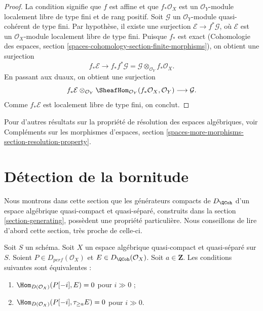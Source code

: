 \begin{proof}
La condition signifie que $f$ est affine et que $f_*\mathcal{O}_X$ est un
$\mathcal{O}_Y$-module localement libre de type fini et de rang positif.
Soit $\mathcal{G}$ un $\mathcal{O}_Y$-module quasi-coh\'erent de type fini.
Par hypoth\`ese, il existe une surjection
$\mathcal{E}\to f^*\mathcal{G}$, o\`u $\mathcal{E}$ est un
$\mathcal{O}_X$-module localement libre de type fini. Puisque $f_*$ est exact
(Cohomologie des espaces, section
\ref{spaces-cohomology-section-finite-morphisms}), on obtient une surjection
$$
f_*\mathcal{E}
\longrightarrow
f_*f^*\mathcal{G} = \mathcal{G} \otimes_{\mathcal{O}_Y} f_*\mathcal{O}_X.
$$
En passant aux duaux, on obtient une surjection
$$
f_*\mathcal{E}
\otimes_{\mathcal{O}_Y}
\SheafHom_{\mathcal{O}_Y}(f_*\mathcal{O}_X, \mathcal{O}_Y)
\longrightarrow
\mathcal{G}.
$$
Comme $f_*\mathcal{E}$ est localement libre de type fini, on conclut.
\end{proof}

\noindent
Pour d'autres r\'esultats sur la propri\'et\'e de r\'esolution des espaces
alg\'ebriques, voir Compl\'ements sur les morphismes d'espaces, section
\ref{spaces-more-morphisms-section-resolution-property}.












\section{D\'etection de la bornitude}
\label{section-detecting-boundedness}

\noindent
Nous montrons dans cette section que les g\'en\'erateurs compacts de $D_\QCoh$
d'un espace alg\'ebrique quasi-compact et quasi-s\'epar\'e, construits dans la
section \ref{section-generating}, poss\`edent une propri\'et\'e particuli\`ere.
Nous conseillons de lire d'abord cette section, tr\`es proche de celle-ci.

\begin{lemma}
\label{lemma-bounded-truncation}
Soit $S$ un sch\'ema.
Soit $X$ un espace alg\'ebrique quasi-compact et quasi-s\'epar\'e sur $S$.
Soient $P\in D_{perf}(\mathcal{O}_X)$ et
$E\in D_{\QCoh}(\mathcal{O}_X)$. Soit $a\in\mathbf{Z}$.
Les conditions suivantes sont \'equivalentes :
\begin{enumerate}
\item $\Hom_{D(\mathcal{O}_X)}(P[-i],E)=0$ pour $i\gg0$ ;
\item $\Hom_{D(\mathcal{O}_X)}(P[-i],\tau_{\geq a}E)=0$ pour $i\gg0$.
\end{enumerate}
\end{lemma}

